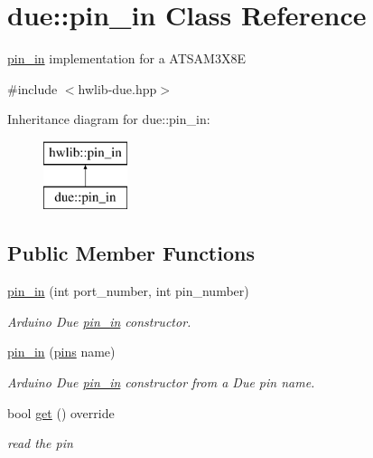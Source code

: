 \hypertarget{classdue_1_1pin__in}{}\section{due\+:\+:pin\+\_\+in Class Reference}
\label{classdue_1_1pin__in}


\hyperlink{classdue_1_1pin__in}{pin\+\_\+in} implementation for a A\+T\+S\+A\+M3\+X8E  




{\ttfamily \#include $<$hwlib-\/due.\+hpp$>$}

Inheritance diagram for due\+:\+:pin\+\_\+in\+:\begin{figure}[H]
\begin{center}
\leavevmode
\includegraphics[height=2.000000cm]{classdue_1_1pin__in}
\end{center}
\end{figure}
\subsection*{Public Member Functions}
\begin{DoxyCompactItemize}
\item 
\hyperlink{classdue_1_1pin__in_ae57de72b79b4b603e46d518695742b3a}{pin\+\_\+in} (int port\+\_\+number, int pin\+\_\+number)
\begin{DoxyCompactList}\small\item\em Arduino Due \hyperlink{classdue_1_1pin__in}{pin\+\_\+in} constructor. \end{DoxyCompactList}\item 
\hyperlink{classdue_1_1pin__in_a91f66ca279e18ced46cf693bcf3c0935}{pin\+\_\+in} (\hyperlink{namespacedue_a8ffa3ec309934ff9db34317e504bcc92}{pins} name)
\begin{DoxyCompactList}\small\item\em Arduino Due \hyperlink{classdue_1_1pin__in}{pin\+\_\+in} constructor from a Due pin name. \end{DoxyCompactList}\item 
bool \hyperlink{classdue_1_1pin__in_abfadd4fd4c1aef21c1243bc69ce55b1c}{get} () override
\begin{DoxyCompactList}\small\item\em read the pin \end{DoxyCompactList}\end{DoxyCompactItemize}


